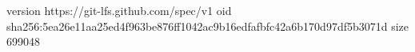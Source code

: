 version https://git-lfs.github.com/spec/v1
oid sha256:5ea26e11aa25ed4f963be876ff1042ac9b16edfafbfc42a6b170d97df5b3071d
size 699048
